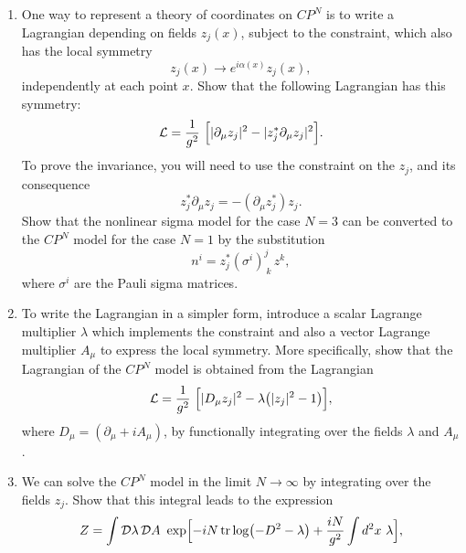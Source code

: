 \begin{enumerate}[label=(\alph*)]
  \item One way to represent a theory of coordinates on $CP^N$ is to write a
    Lagrangian depending on fields $z_j(x)$, subject to the constraint, which
    also has the local symmetry
    \begin{equation}
      z_j(x) \to e^{i\alpha(x)} z_j(x) ,
    \end{equation}
    independently at each point $x$.  Show that the following Lagrangian has
    this symmetry:
    \begin{equation}
      \mathcal{L} = \frac{1}{g^2}\ \Bigl[ |\partial_\mu z_j|^2
        - |z_j^{*}\partial_\mu z_j|^2 \Bigr] .
    \end{equation}
    To prove the invariance, you will need to use the constraint on the
    $z_j$, and its consequence
    \begin{equation}
      z_j^{*}\partial_\mu z_j = -(\partial_\mu z_j^{*})z_j .
    \end{equation}
    Show that the nonlinear sigma model for the case $N = 3$ can be
    converted to the $CP^N$ model for the case $N = 1$ by the substitution
    \begin{equation}
      n^i = z^{*}_j(\sigma^i)^j_{\ k}\,z^k ,
    \end{equation}
    where $\sigma^i$ are the Pauli sigma matrices.
  \item To write the Lagrangian in a simpler form, introduce a scalar
    Lagrange multiplier $\lambda$ which implements the constraint and also a
    vector Lagrange multiplier $A_\mu$ to express the local symmetry.  More
    specifically, show that the Lagrangian of the $CP^N$ model is obtained
    from the Lagrangian
    \begin{equation}
      \mathcal{L} = \frac{1}{g^2}\ \Bigl[ |D_\mu z_j|^2 - \lambda\bigl(
        |z_j|^2 - 1 \bigr) \Bigr] ,
    \end{equation}
    where $D_\mu = (\partial_\mu + iA_\mu)$, by functionally integrating over
    the fields $\lambda$ and $A_\mu$.
  \item We can solve the $CP^N$ model in the limit $N\to\infty$ by
    integrating over the fields $z_j$.  Show that this integral leads to the
    expression
    \begin{equation}
      Z = \int \mathcal{D}\lambda\,\mathcal{D}A\ \exp\Bigl[ -iN\,
        \mathrm{tr}\log\bigl( -D^2 - \lambda \bigr) + \frac{iN}{g^2}\int d^2x\
          \lambda \Bigr] ,
    \end{equation}

\end{enumerate}
